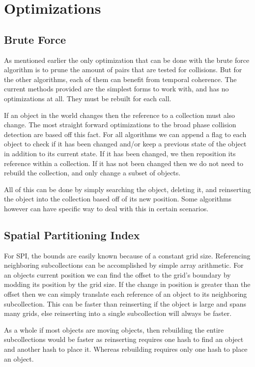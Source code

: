 \documentclass[conference]{IEEEtran}
\begin{document}
\section{Optimizations}

\subsection{Brute Force}

As mentioned earlier the only optimization that can be done with the brute force algorithm is to prune the amount of pairs that are tested for collisions. But for the other algorithms, each of them can benefit from temporal coherence. The current methods provided are the simplest forms to work with, and has no optimizations at all. They must be rebuilt for each call. 

If an object in the world changes then the reference to a collection must also change. The most straight forward optimizations to the broad phase collision detection are based off this fact. For all algorithms we can append a flag to each object to check if it has been changed and/or keep a previous state of the object in addition to its current state. If it has been changed, we then reposition its reference within a collection. If it has not been changed then we do not need to rebuild the collection, and only change a subset of objects.

All of this can be done by simply searching the object, deleting it, and reinserting the object into the collection based off of its new position. Some algorithms however can have specific way to deal with this in certain scenarios.

\subsection{Spatial Partitioning Index}

For SPI, the bounds are easily known because of a constant grid size. Referencing neighboring subcollections can be accomplished by simple array arithmetic. For an objects current position we can find the offset to the grid's boundary by modding its position by the grid size. If the change in position is greater than the offset then we can simply translate each reference of an object to its neighboring subcollection. This can be faster than reinserting if the object is large and spans many grids, else reinserting into a single subcollection will always be faster.

As a whole if most objects are moving objects, then rebuilding the entire subcollections would be faster as reinserting requires one hash to find an object and another hash to place it. Whereas rebuilding requires only one hash to place an object.
\end{document}
